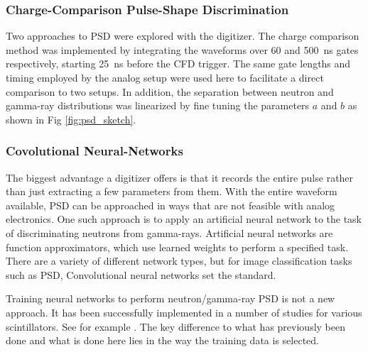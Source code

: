 \documentclass[main.tex]{subfiles}
\begin{document}
\subsubsection{Charge-Comparison Pulse-Shape Discrimination}
Two approaches to PSD were explored with the digitizer. The charge comparison method was implemented by integrating the waveforms over 60 and \SI{500}{ns} gates respectively, starting \SI{25}{ns} before the CFD trigger. The same gate lengths and timing employed by the analog setup were used here to facilitate a direct comparison to two setups. In addition, the separation between neutron and gamma-ray distributions was linearized by fine tuning the parameters $a$ and $b$ as shown in Fig \ref{fig:psd_sketch}.

\subsubsection{Covolutional Neural-Networks}\label{sec:cnn}
The biggest advantage a digitizer offers is that it records the entire pulse rather than just extracting a few parameters from them. With the entire waveform available, PSD can be approached in ways that are not feasible with analog electronics. One such approach is to apply an artificial neural network to the task of discriminating neutrons from gamma-rays. 
Artificial neural networks are function approximators, which use learned weights to perform a specified task. There are a variety of different network types, but for image classification tasks such as PSD, Convolutional neural networks set the standard. 

Training neural networks to perform neutron/gamma-ray PSD is not a new approach. It has been successfully implemented in a number of studies for various scintillators. See for example \cite{Griffiths}. The key difference to what has previously been done and what is done here lies in the way the training data is selected.
\end{document}
